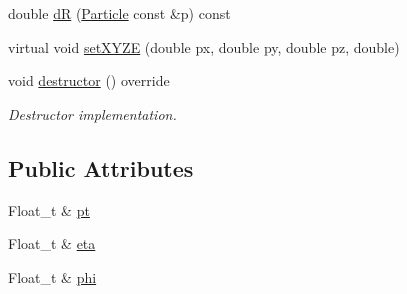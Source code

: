 \begin{DoxyCompactItemize}
\item 
double \hyperlink{classpanda_1_1Particle_adbc50bce85d9da56699bbd7d9ab1e4bf}{dR} (\hyperlink{classpanda_1_1Particle}{Particle} const \&p) const 
\item 
virtual void \hyperlink{classpanda_1_1Particle_adc7a78ac2476aac1648ae81f70e17211}{setXYZE} (double px, double py, double pz, double)
\item 
void \hyperlink{classpanda_1_1Particle_ad1a5f606b804ac2ec5d7e391aba6bda6}{destructor} () override
\begin{DoxyCompactList}\small\item\em Destructor implementation. \item\end{DoxyCompactList}\end{DoxyCompactItemize}
\subsection*{Public Attributes}
\begin{DoxyCompactItemize}
\item 
Float\_\-t \& \hyperlink{classpanda_1_1Particle_a9b74430c3c732132e01e6e215a6b3dd0}{pt}
\item 
Float\_\-t \& \hyperlink{classpanda_1_1Particle_a57287d1410aa744cfb39a067bf4b44b7}{eta}
\item 
Float\_\-t \& \hyperlink{classpanda_1_1Particle_acc1b5ccbda5824dcf754a6a4856c44da}{phi}
\end{DoxyCompactItemize}
